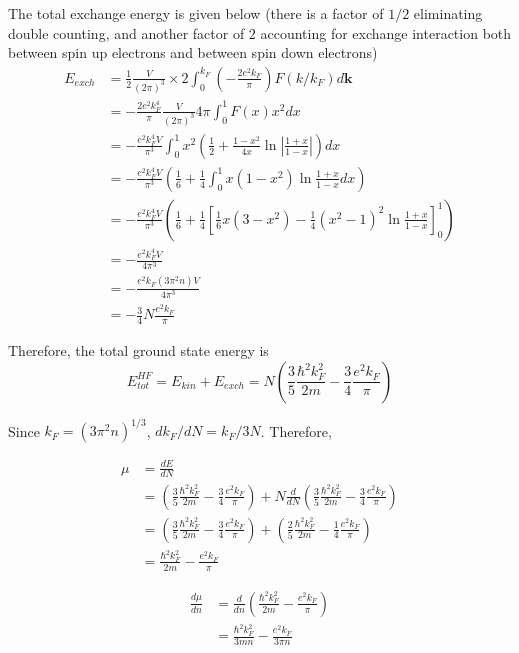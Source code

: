 \documentclass{article}
\begin{document}
The total exchange energy is given below (there is a factor of $1/2$ eliminating double counting, and another factor of $2$ accounting for exchange interaction both between spin up electrons and between spin down electrons)
\begin{align*}
E_{exch}&=\frac{1}{2}\frac{V}{(2\pi)^3}\times 2\int_0^{k_F}\left(-\frac{2e^2k_F}{\pi}\right)F(k/k_F)d\mathbf{k}\\
&=-\frac{2e^2k_F^4}{\pi}\frac{V}{(2\pi)^3}4\pi\int_0^1F(x)x^2dx\\
&=-\frac{e^2k_F^4V}{\pi^3}\int_0^1x^2\left(\frac{1}{2}+\frac{1-x^2}{4x}\ln\left|\frac{1+x}{1-x}\right|\right)dx\\
&=-\frac{e^2k_F^4V}{\pi^3}\left(\frac{1}{6}+\frac{1}{4}\int_0^1x(1-x^2)\ln\frac{1+x}{1-x}dx\right)\\
&=-\frac{e^2k_F^4V}{\pi^3}\left(\frac{1}{6}+\frac{1}{4}\left[\frac{1}{6}x(3-x^2)-\frac{1}{4}(x^2-1)^2\ln\frac{1+x}{1-x}\right]_0^1\right)\\
&=-\frac{e^2k_F^4V}{4\pi^3}\\
&=-\frac{e^2k_F(3\pi^2n)V}{4\pi^3}\\
&=-\frac{3}{4}N\frac{e^2k_F}{\pi}
\end{align*}

Therefore, the total ground state energy is
\begin{equation*}
E^{H\!F}_{tot}=E_{kin}+E_{exch}=N\left(\frac{3}{5}\frac{\hbar^2k_F^2}{2m}-\frac{3}{4}\frac{e^2k_F}{\pi}\right)
\end{equation*}

Since $k_F=(3\pi^2n)^{1/3}$, $dk_F/dN=k_F/3N$. Therefore,

\begin{align*}
\mu&=\frac{dE}{dN}\\
&=\left(\frac{3}{5}\frac{\hbar^2k_F^2}{2m}-\frac{3}{4}\frac{e^2k_F}{\pi}\right)+N\frac{d}{dN}\left(\frac{3}{5}\frac{\hbar^2k_F^2}{2m}-\frac{3}{4}\frac{e^2k_F}{\pi}\right)\\
&=\left(\frac{3}{5}\frac{\hbar^2k_F^2}{2m}-\frac{3}{4}\frac{e^2k_F}{\pi}\right)+\left(\frac{2}{5}\frac{\hbar^2k_F^2}{2m}-\frac{1}{4}\frac{e^2k_F}{\pi}\right)\\
&=\frac{\hbar^2k_F^2}{2m}-\frac{e^2k_F}{\pi}
\end{align*}

\begin{align*}
\frac{d\mu}{dn}&=\frac{d}{dn}\left(\frac{\hbar^2k_F^2}{2m}-\frac{e^2k_F}{\pi}\right)\\
&=\frac{\hbar^2k_F^2}{3mn}-\frac{e^2k_F}{3\pi n}
\end{align*}
\end{document}
